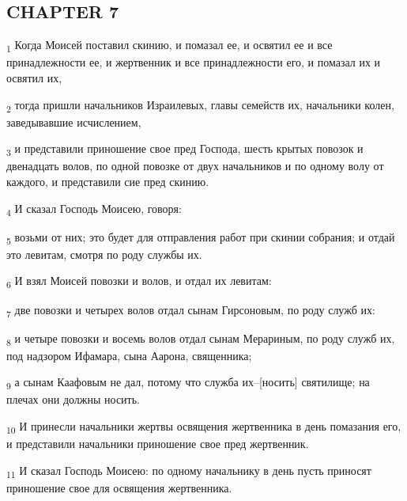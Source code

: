 \subsection{CHAPTER 7}
\begin{tcolorbox}
\textsubscript{1} Когда Моисей поставил скинию, и помазал ее, и освятил ее и все принадлежности ее, и жертвенник и все принадлежности его, и помазал их и освятил их,
\end{tcolorbox}
\begin{tcolorbox}
\textsubscript{2} тогда пришли начальников Израилевых, главы семейств их, начальники колен, заведывавшие исчислением,
\end{tcolorbox}
\begin{tcolorbox}
\textsubscript{3} и представили приношение свое пред Господа, шесть крытых повозок и двенадцать волов, по одной повозке от двух начальников и по одному волу от каждого, и представили сие пред скинию.
\end{tcolorbox}
\begin{tcolorbox}
\textsubscript{4} И сказал Господь Моисею, говоря:
\end{tcolorbox}
\begin{tcolorbox}
\textsubscript{5} возьми от них; это будет для отправления работ при скинии собрания; и отдай это левитам, смотря по роду службы их.
\end{tcolorbox}
\begin{tcolorbox}
\textsubscript{6} И взял Моисей повозки и волов, и отдал их левитам:
\end{tcolorbox}
\begin{tcolorbox}
\textsubscript{7} две повозки и четырех волов отдал сынам Гирсоновым, по роду служб их:
\end{tcolorbox}
\begin{tcolorbox}
\textsubscript{8} и четыре повозки и восемь волов отдал сынам Мерариным, по роду служб их, под надзором Ифамара, сына Аарона, священника;
\end{tcolorbox}
\begin{tcolorbox}
\textsubscript{9} а сынам Каафовым не дал, потому что служба их--[носить] святилище; на плечах они должны носить.
\end{tcolorbox}
\begin{tcolorbox}
\textsubscript{10} И принесли начальники жертвы освящения жертвенника в день помазания его, и представили начальники приношение свое пред жертвенник.
\end{tcolorbox}
\begin{tcolorbox}
\textsubscript{11} И сказал Господь Моисею: по одному начальнику в день пусть приносят приношение свое для освящения жертвенника.
\end{tcolorbox}
